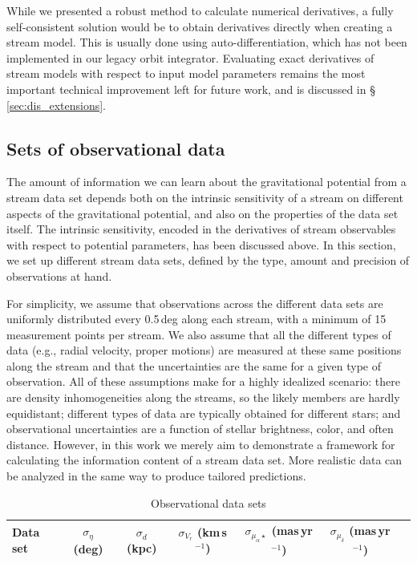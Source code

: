 \documentclass[modern]{aastex62}
\begin{document}
While we presented a robust method to calculate numerical derivatives, a fully self-consistent solution would be to obtain derivatives directly when creating a stream model.
This is usually done using auto-differentiation, which has not been implemented in our legacy orbit integrator.
Evaluating exact derivatives of stream models with respect to input model parameters remains the most important technical improvement left for future work, and is discussed in \S\,\ref{sec:dis_extensions}.


\subsection{Sets of observational data}
\label{sec:datasets}

The amount of information we can learn about the gravitational potential from a stream data set depends both on the intrinsic sensitivity of a stream on different aspects of the gravitational potential, and also on the properties of the data set itself.
The intrinsic sensitivity, encoded in the derivatives of stream observables with respect to potential parameters, has been discussed above.
In this section, we set up different stream data sets, defined by the type, amount and precision of observations at hand.

For simplicity, we assume that observations across the different data sets are uniformly distributed every 0.5\,deg along each stream, with a minimum of 15 measurement points per stream.
We also assume that all the different types of data (e.g., radial velocity, proper motions) are measured at these same positions along the stream and that the uncertainties are the same for a given type of observation.
All of these assumptions make for a highly idealized scenario: there are density inhomogeneities along the streams, so the likely members are hardly equidistant; different types of data are typically obtained for different stars; and observational uncertainties are a function of stellar brightness, color, and often distance.
However, in this work we merely aim to demonstrate a framework for calculating the information content of a stream data set.
More realistic data can be analyzed in the same way to produce tailored predictions.

\begin{table}
\begin{center}
\begin{tabular}{l c c c c c c}
\hline
\hline
Data set & $\sigma_\eta$ (deg) & $\sigma_d$ (kpc) & $\sigma_{V_r}$ (km\,s$^{-1}$) & $\sigma_{\mu_\alpha\star}$ (mas\,yr$^{-1}$) & $\sigma_{\mu_\delta}$ (mas\,yr$^{-1}$) \\
\hline

\hline
\hline
\end{tabular}
\caption{Observational data sets}
\label{t:datasets}
\end{center}
\end{table}
\end{document}
